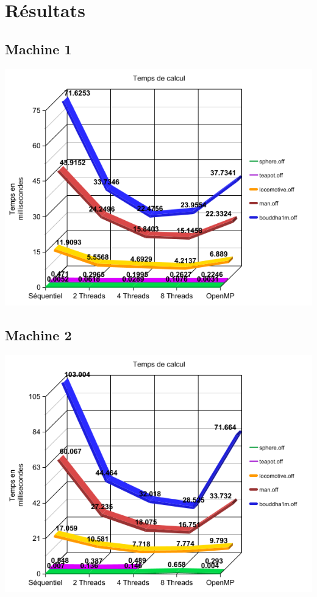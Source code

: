 \documentclass[a4paper]{article}
\begin{document}
\section{Résultats}
	\subsection{Machine 1}
	\begin{center}
		\includegraphics[scale = 0.5]{graph_execTime_machine1.png}
	\end{center}

	\subsection{Machine 2}
	\begin{center}
		\includegraphics[scale = 0.5]{graph_execTime_machine2.png}
	\end{center}
\end{document}
